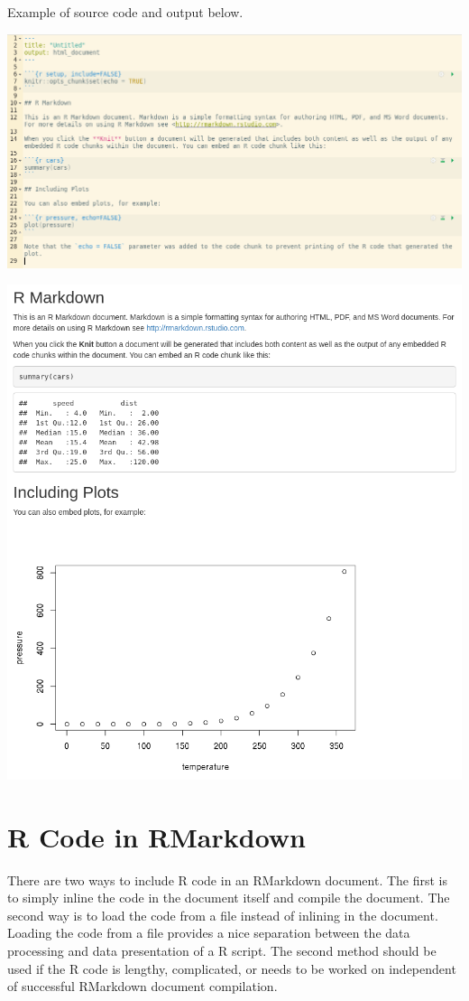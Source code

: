 \documentclass[
]{book}
\begin{document}
Example of source code and output below.

\includegraphics{images/03-rmarkdown_1.png}

\includegraphics{images/03-rmarkdown_2.png}

\hypertarget{r-code-in-rmarkdown}{%
\section{R Code in RMarkdown}\label{r-code-in-rmarkdown}}

There are two ways to include R code in an RMarkdown document. The first is to simply inline the code in the document itself and compile the document. The second way is to load the code from a file instead of inlining in the document. Loading the code from a file provides a nice separation between the data processing and data presentation of a R script. The second method should be used if the R code is lengthy, complicated, or needs to be worked on independent of successful RMarkdown document compilation.
\end{document}
